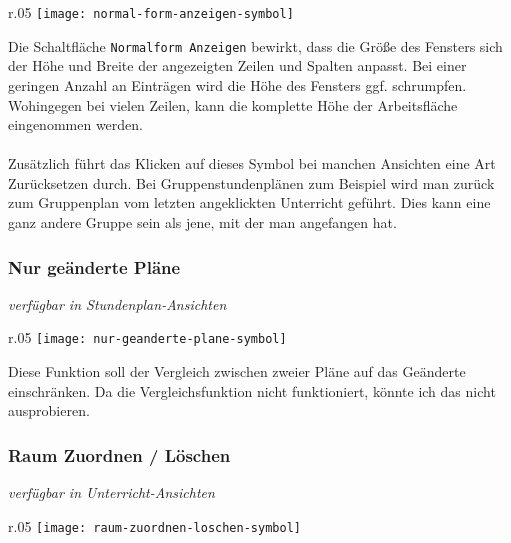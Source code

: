 \begin{wrapfigure}{r}{.05\textwidth}
	\vspace{-50pt}
	\texttt{[image: normal-form-anzeigen-symbol]}
	\vspace{-35pt}
\end{wrapfigure}

\noindent
Die Schaltfläche \texttt{Normalform Anzeigen} bewirkt, dass die Größe des Fensters sich der Höhe und Breite der angezeigten Zeilen und Spalten anpasst. Bei einer geringen Anzahl an Einträgen wird die Höhe des Fensters ggf. schrumpfen. Wohingegen bei vielen Zeilen, kann die komplette Höhe der Arbeitsfläche eingenommen werden.\\
\\
Zusätzlich führt das Klicken auf dieses Symbol bei manchen Ansichten eine Art Zurücksetzen durch. Bei Gruppenstundenplänen zum Beispiel wird man zurück zum Gruppenplan vom letzten angeklickten Unterricht geführt. Dies kann eine ganz andere Gruppe sein als jene, mit der man angefangen hat.

\subsubsection{Nur geänderte Pläne}
{\small\textit{verfügbar in Stundenplan-Ansichten\\}\par}

\begin{wrapfigure}{r}{.05\textwidth}
	\vspace{-50pt}
	\texttt{[image: nur-geanderte-plane-symbol]}
	\vspace{-35pt}
\end{wrapfigure}

\noindent
Diese Funktion soll der Vergleich zwischen zweier Pläne auf das Geänderte einschränken. Da die Vergleichsfunktion nicht funktioniert, könnte ich das nicht ausprobieren.

\subsubsection{Raum Zuordnen / Löschen}
\label{subsubsec:raum-zuordnen-loschen}
{\small\textit{verfügbar in Unterricht-Ansichten\\}\par}

\begin{wrapfigure}{r}{.05\textwidth}
	\vspace{-50pt}
	\texttt{[image: raum-zuordnen-loschen-symbol]}
	\vspace{-35pt}
\end{wrapfigure}

